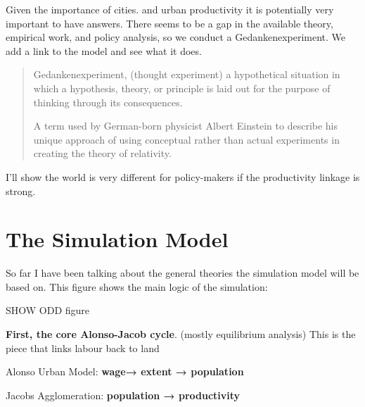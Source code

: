 \documentclass[]{article}
\begin{document}
Given the importance of cities. and urban productivity it is potentially very important to have answers. There seems to be a gap in the available theory, empirical work, and policy analysis, so we conduct a Gedankenexperiment. We add a link to the model and see what it does.
    \begin{quotation}
    Gedankenexperiment, (thought experiment) a hypothetical situation in which a hypothesis, theory, or principle is laid out for the purpose of thinking through its consequences.

    A term used by German-born physicist Albert Einstein to describe his unique approach of using conceptual rather than actual experiments in creating the theory of relativity.
    \end{quotation}



I’ll show the world is very different for policy-makers if the productivity linkage is strong.

\section{The Simulation Model }
So far I have been talking about the general theories the simulation model will be based on. This figure shows the main logic of the simulation:

\hspace{4cm}SHOW ODD figure%





\noindent \textbf{First, the core Alonso-Jacob cycle}. (mostly equilibrium analysis) This is the piece that links labour back to land

Alonso Urban Model: \textbf{wage→ extent → population} %

Jacobs Agglomeration: \textbf{ population → productivity}
\end{document}
